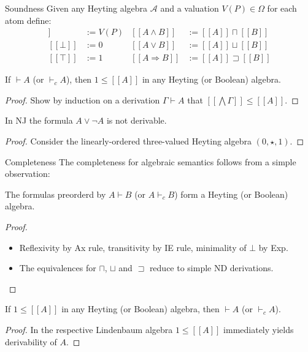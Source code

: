 \documentclass[xcolor=dvipsnames,aspectratio=169,handout]{beamer}
\renewcommand{\to}{\Rightarrow}
\renewcommand{\AA}{\mathcal A}
\begin{document}
\newcommand{\lsem}{[\![}
\newcommand{\rsem}{]\!]}
\renewcommand{\LL}{\mathcal{L}}

\begin{frame}{Soundness}
	\pause
	Given any Heyting algebra $\AA$ and a valuation $V(P)\in \Omega$ for each atom define:
	\begin{align*}
		\lsem P\rsem &:= V(P)& \lsem A\land B\rsem &:= \lsem A\rsem \sqcap \lsem B\rsem\\
		\lsem \bot\rsem &:= 0& \lsem A\lor B\rsem &:= \lsem A\rsem \sqcup \lsem B\rsem\\
		\lsem \top\rsem &:= 1& \lsem A\to B\rsem &:= \lsem A\rsem \sqsupset \lsem B\rsem
	\end{align*}
	\vspace{-0.5cm}
	\pause
	\begin{theorem}[Soundness]
		If $\vdash A$ (or $\vdash_c A$), then $1\le \lsem A\rsem$ in any Heyting (or Boolean) algebra.
	\end{theorem}
	\vspace{-0.2cm}
	\pause
	\begin{proof}
		Show by induction on a derivation $\Gamma\vdash A$ that $\lsem \bigwedge\Gamma\rsem \le \lsem A\rsem$.
	\end{proof}
	\pause
	\begin{corollary}
		In NJ the formula $A\lor \neg A$ is not derivable.
	\end{corollary}
	\vspace{-0.2cm}
	\pause
	\begin{proof}
		Consider the linearly-ordered three-valued Heyting algebra $(0,\star,1)$.
	\end{proof}
\end{frame}

\begin{frame}{Completeness}
	\pause
	The completeness for algebraic semantics follows from a simple observation:
	\pause
	\begin{fact}
		The formulas preorderd by $A\vdash B$ (or $A\vdash_c B$) form a Heyting (or Boolean) algebra.
	\end{fact}
	\vspace{-0.2cm}
	\pause
	\begin{proof}
		\begin{itemize}
			\pause
			\item
			Reflexivity by Ax rule, transitivity by IE rule, minimality of $\bot$ by Exp.
			\pause
			\item
			The equivalences for $\sqcap$, $\sqcup$ and $\sqsupset$ reduce to simple ND derivations.
			\qedhere
		\end{itemize}
	\end{proof}
	\pause
	\begin{corollary}[Completeness]
		If $1\le \lsem A\rsem$ in any Heyting (or Boolean) algebra, then $\vdash A$ (or $\vdash_c A$).
	\end{corollary}
	\vspace{-0.2cm}
	\pause
	\begin{proof}
		In the respective Lindenbaum algebra $1\le \lsem A\rsem$ immediately yields derivability of $A$.
	\end{proof}
\end{frame}
\end{document}

